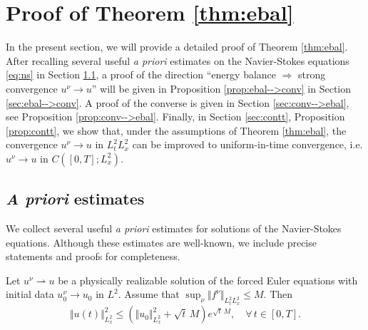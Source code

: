 \documentclass[reqno,12pt]{amsart}
\begin{document}
\section{Proof of Theorem \ref{thm:ebal}}
\label{sec:ebal}

In the present section, we will provide a detailed proof of Theorem \ref{thm:ebal}. After recalling several useful {\it a priori} estimates on the Navier-Stokes equations \eqref{eq:ns} in Section \ref{sec:apriori}, a proof of the direction ``energy balance $\Rightarrow$ strong convergence $u^\nu \to u$'' will be given in Proposition \ref{prop:ebal-->conv} in Section \ref{sec:ebal-->conv}. A proof of the converse is given in Section \ref{sec:conv-->ebal}, see Proposition \ref{prop:conv-->ebal}. Finally, in Section \ref{sec:contt}, Proposition \ref{prop:contt}, we show that, under the assumptions of Theorem \ref{thm:ebal}, the convergence $u^\nu \to u$ in $L^2_tL^2_x$ can be improved to uniform-in-time convergence, i.e. $u^\nu \to u$ in $C([0,T];L^2_x)$.

\subsection{{\it A priori} estimates}
\label{sec:apriori}
We collect several useful {\it a priori} estimates for solutions of the Navier-Stokes equations. Although these estimates are well-known, we include precise statements and proofs for completeness.

\begin{lemma} \label{lem:upperbound}
Let $u^\nu \rightharpoonup u$ be a physically realizable solution of the forced Euler equations with initial data $u_0^\nu\to u_0$ in $L^2$. Assume that $\sup_{\nu} \Vert f^\nu \Vert_{L^2_tL^2_x} \le M$. Then
\[
\Vert u(t) \Vert_{L^2_x}^2
\le
\left(
\Vert u_0 \Vert_{L^2_x}^2
+
\sqrt{t} \,M
\right)
e^{\sqrt{t} \, M }, \quad \forall \, t\in [0,T].
\]
\end{lemma}
\end{document}
